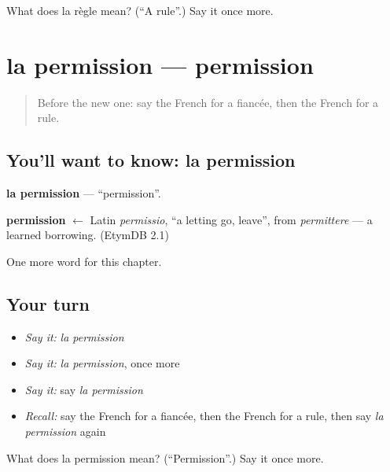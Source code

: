 \begin{tcolorbox}[breakable,colback=teal!4,colframe=teal!35!black,title={Before you move on}]
What does la règle mean? (\textquotedblleft{}A rule\textquotedblright{}.) Say it once more.
\end{tcolorbox}
\section[la permission]{la permission — permission}

\label{lesson:FR-C168-permission}



\begin{quote}
Before the new one: say the French for a fiancée, then the French for a rule.
\end{quote}

\subsection*{You'll want to know: la permission}
\textbf{la permission} — \textquotedblleft{}permission\textquotedblright{}.

\begin{cousinweb}
\textbf{permission} $\leftarrow$ Latin \emph{permissio}, \textquotedblleft{}a letting go, leave\textquotedblright{}, from \emph{permittere} — a learned borrowing. (EtymDB 2.1)
\end{cousinweb}

\begin{grammarlens}[title={What you've built}]
One more word for this chapter.
\end{grammarlens}

\subsection*{Your turn}
\begin{itemize}
\raggedright
  \item \emph{Say it:} \emph{la permission}
  \item \emph{Say it:} \emph{la permission}, once more
  \item \emph{Say it:} say \emph{la permission}
  \item \emph{Recall:} say the French for a fiancée, then the French for a rule, then say \emph{la permission} again
\end{itemize}

\begin{tcolorbox}[breakable,colback=teal!4,colframe=teal!35!black,title={Before you move on}]
What does la permission mean? (\textquotedblleft{}Permission\textquotedblright{}.) Say it once more.
\end{tcolorbox}
